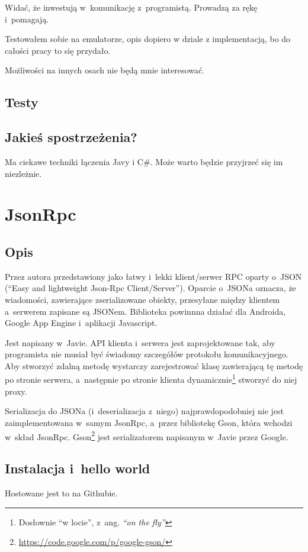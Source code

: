 Widać, że inwestują w~komunikację z~programistą. Prowadzą za rękę i~pomagają.

Testowałem sobie na emulatorze, opis dopiero w dziale z implementacją, bo do całości pracy to się przydało.

Możliwości na innych osach nie będą mnie interesować.

\subsection{Testy}
\subsection{Jakieś spostrzeżenia?}
Ma ciekawe techniki łączenia Javy i C\#. Może warto będzie przyjrzeć się im niezleżnie.


\section{JsonRpc}
\subsection{Opis}
Przez autora przedstawiony jako łatwy i~lekki klient/serwer RPC oparty o~JSON (``Easy and lightweight Json-Rpc Client/Server'')\cite{json-rpc}.
Oparcie o~JSONa oznacza, że wiadomości, zawierające zserializowane obiekty, przesyłane między klientem a~serwerem zapisane są JSONem. Biblioteka powinnna działać dla Androida, Google App Engine i~aplikacji Javascript.

Jest napisany w~Javie.
API klienta i~serwera jest zaprojektowane tak, aby programista nie musiał być świadomy szczegółów protokołu komunikacyjnego.
Aby stworzyć zdalną metodę wystarczy zarejestrować klasę zawierającą tę metodę po stronie serwera, a~następnie po stronie klienta dynamicznie\footnote{Dosłownie ``w locie'', z~ang. \emph{``on the fly''}} stworzyć do niej proxy.

Serializacja do JSONa (i~deserializacja z~niego) najprawdopodobniej nie jest zaimplementowana w~samym JsonRpc, a~przez bibliotekę Gson, która wchodzi w~skład JsonRpc. Gson\footnote{\url{https://code.google.com/p/google-gson/}} jest serializatorem napisanym w~Javie przez Google.
 
\subsection{Instalacja i~hello world}
Hostowane jest to na Githubie.

